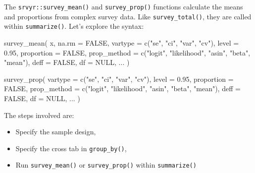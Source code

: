 \documentclass[
]{krantz}
\makeatletter
\newenvironment{Shaded}{\begin{snugshade}}{\end{snugshade}}
\newcommand{\AttributeTok}[1]{\textcolor[rgb]{0.61,0.61,0.61}{#1}}
\newcommand{\ConstantTok}[1]{\textcolor[rgb]{0,0,0}{#1}}
\newcommand{\FloatTok}[1]{\textcolor[rgb]{0.06,0.06,0.06}{#1}}
\newcommand{\FunctionTok}[1]{\textcolor[rgb]{0,0,0}{#1}}
\newcommand{\NormalTok}[1]{#1}
\newcommand{\StringTok}[1]{\textcolor[rgb]{0.5,0.5,0.5}{#1}}
\providecommand{\tightlist}{%
  \setlength{\itemsep}{0pt}\setlength{\parskip}{0pt}}
\newenvironment{kframe}{%
\medskip{}
\setlength{\fboxsep}{.8em}
 \def\at@end@of@kframe{}%
 \ifinner\ifhmode%
  \def\at@end@of@kframe{\end{minipage}}%
  \begin{minipage}{\columnwidth}%
 \fi\fi%
 \def\FrameCommand##1{\hskip\@totalleftmargin \hskip-\fboxsep
 \colorbox{shadecolor}{##1}\hskip-\fboxsep
     \hskip-\linewidth \hskip-\@totalleftmargin \hskip\columnwidth}%
 \MakeFramed {\advance\hsize-\width
   \@totalleftmargin\z@ \linewidth\hsize
   \@setminipage}}%
 {\par\unskip\endMakeFramed%
 \at@end@of@kframe}
\renewenvironment{Shaded}{\begin{kframe}}{\end{kframe}}
\makeatother
\begin{document}
The \texttt{srvyr::survey\_mean()} and \texttt{survey\_prop()} functions calculate the means and proportions from complex survey data. Like \texttt{survey\_total()}, they are called within \texttt{summarize()}. Let's explore the syntax:

\begin{Shaded}
\begin{Highlighting}[]
\FunctionTok{survey\_mean}\NormalTok{(}
\NormalTok{  x,}
  \AttributeTok{na.rm =} \ConstantTok{FALSE}\NormalTok{,}
  \AttributeTok{vartype =} \FunctionTok{c}\NormalTok{(}\StringTok{"se"}\NormalTok{, }\StringTok{"ci"}\NormalTok{, }\StringTok{"var"}\NormalTok{, }\StringTok{"cv"}\NormalTok{),}
  \AttributeTok{level =} \FloatTok{0.95}\NormalTok{,}
  \AttributeTok{proportion =} \ConstantTok{FALSE}\NormalTok{,}
  \AttributeTok{prop\_method =} \FunctionTok{c}\NormalTok{(}\StringTok{"logit"}\NormalTok{, }\StringTok{"likelihood"}\NormalTok{, }\StringTok{"asin"}\NormalTok{, }\StringTok{"beta"}\NormalTok{, }\StringTok{"mean"}\NormalTok{),}
  \AttributeTok{deff =} \ConstantTok{FALSE}\NormalTok{,}
  \AttributeTok{df =} \ConstantTok{NULL}\NormalTok{,}
\NormalTok{  ...}
\NormalTok{)}

\FunctionTok{survey\_prop}\NormalTok{(}
  \AttributeTok{vartype =} \FunctionTok{c}\NormalTok{(}\StringTok{"se"}\NormalTok{, }\StringTok{"ci"}\NormalTok{, }\StringTok{"var"}\NormalTok{, }\StringTok{"cv"}\NormalTok{),}
  \AttributeTok{level =} \FloatTok{0.95}\NormalTok{,}
  \AttributeTok{proportion =} \ConstantTok{FALSE}\NormalTok{,}
  \AttributeTok{prop\_method =} \FunctionTok{c}\NormalTok{(}\StringTok{"logit"}\NormalTok{, }\StringTok{"likelihood"}\NormalTok{, }\StringTok{"asin"}\NormalTok{, }\StringTok{"beta"}\NormalTok{, }\StringTok{"mean"}\NormalTok{),}
  \AttributeTok{deff =} \ConstantTok{FALSE}\NormalTok{,}
  \AttributeTok{df =} \ConstantTok{NULL}\NormalTok{,}
\NormalTok{  ...}
\NormalTok{)}
\end{Highlighting}
\end{Shaded}

The steps involved are:

\begin{itemize}
\tightlist
\item
  Specify the sample design,
\item
  Specify the cross tab in \texttt{group\_by()},
\item
  Run \texttt{survey\_mean()} or \texttt{survey\_prop()} within \texttt{summarize()}
\end{itemize}
\end{document}

